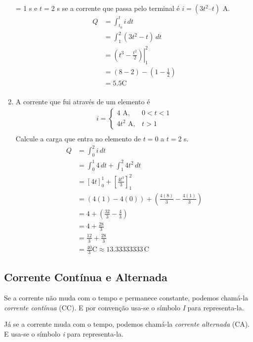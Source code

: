 \begin{enumerate}
	      = 1 \) s e \( t = 2 \) s se a corrente que passa pelo terminal é \( i = (3t^2
	      – t) \) A.
	      \[
		      \begin{aligned}
			      Q & = \int_{t_0}^{t} i\,dt                            \\
			        & = \int_{1}^{2} (3t^2 - t)\,dt                     \\
			        & = \left.\left(t^3-\frac{t^2}{2}\right)\right|_1^2 \\
			        & = (8 - 2) - (1 - \frac{1}{2})                     \\
			        & = 5.5 \text{C}                                    \\
		      \end{aligned}
	      \]
	\item A corrente que fui através de um elemento é
	      \[
		      \begin{aligned}
			      i = \begin{cases}4 \text{~A},     & 0<t<1 \\
             4 t^2 \text{~A}, & t>1\end{cases} \\
		      \end{aligned}
	      \]
	      Calcule a carga que entra no elemento de \( t = 0 \) a \( t = 2 \) s.
	      \[
		      \begin{aligned}
			      Q & = \int_{0}^{2} i\,dt                                           \\
			        & = \int_{0}^{1} 4\,dt + \int_{1}^{2} 4t^2\,dt                   \\
			        & = \left[4t\right]_0^1 + \left[\frac{4t^3}{3}\right]_1^2        \\
			        & = (4(1) - 4(0)) + \left(\frac{4(8)}{3} - \frac{4(1)}{3}\right) \\
			        & = 4 + \left(\frac{32}{3} - \frac{4}{3}\right)                  \\
			        & = 4 + \frac{28}{3}                                             \\
			        & = \frac{12}{3} + \frac{28}{3}                                  \\
			        & = \frac{40}{3} \text{C} \approx 13.33333333 \,\text{C}
		      \end{aligned}
	      \]
\end{enumerate}

\subsection{\textbf{Corrente Contínua e Alternada}}

Se a corrente não muda com o tempo e permanece constante, podemos chamá-la
\textit{corrente contínua} (CC). E por convenção usa-se o símbolo \textit{I}
para representa-la.

Já se a corrente muda com o tempo, podemos chamá-la \textit{corrente alternada}
(CA). E usa-se o símbolo \textit{i} para representa-la.
